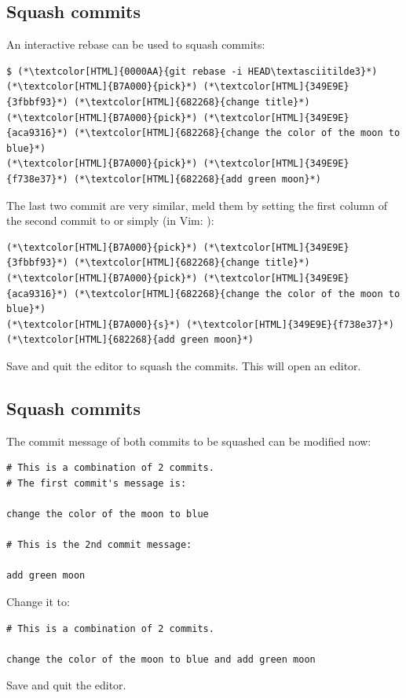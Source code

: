 \subsection{Squash commits}
\begin{frame}[fragile]
  \subslidetitle
  An interactive rebase can be used to squash commits:
  \begin{lstlisting}
$ (*\textcolor[HTML]{0000AA}{git rebase -i HEAD\textasciitilde3}*)
(*\textcolor[HTML]{B7A000}{pick}*) (*\textcolor[HTML]{349E9E}{3fbbf93}*) (*\textcolor[HTML]{682268}{change title}*)
(*\textcolor[HTML]{B7A000}{pick}*) (*\textcolor[HTML]{349E9E}{aca9316}*) (*\textcolor[HTML]{682268}{change the color of the moon to blue}*)
(*\textcolor[HTML]{B7A000}{pick}*) (*\textcolor[HTML]{349E9E}{f738e37}*) (*\textcolor[HTML]{682268}{add green moon}*)
\end{lstlisting}

  The last two commit are very similar, meld them by setting the first
  column of the second commit to  or simply  (in Vim: ):
  \begin{lstlisting}
(*\textcolor[HTML]{B7A000}{pick}*) (*\textcolor[HTML]{349E9E}{3fbbf93}*) (*\textcolor[HTML]{682268}{change title}*)
(*\textcolor[HTML]{B7A000}{pick}*) (*\textcolor[HTML]{349E9E}{aca9316}*) (*\textcolor[HTML]{682268}{change the color of the moon to blue}*)
(*\textcolor[HTML]{B7A000}{s}*) (*\textcolor[HTML]{349E9E}{f738e37}*) (*\textcolor[HTML]{682268}{add green moon}*)
\end{lstlisting}
  Save and quit the editor to squash the commits. This will open an editor.
\end{frame}

\subsection{Squash commits}
\begin{frame}[fragile]
  \subslidetitle
  The commit message of both commits to be squashed can be modified now:
  \begin{lstlisting}
# This is a combination of 2 commits.
# The first commit's message is:

change the color of the moon to blue

# This is the 2nd commit message:

add green moon
\end{lstlisting}

  Change it to:
  \begin{lstlisting}
# This is a combination of 2 commits.

change the color of the moon to blue and add green moon

\end{lstlisting}
  Save and quit the editor.
\end{frame}

